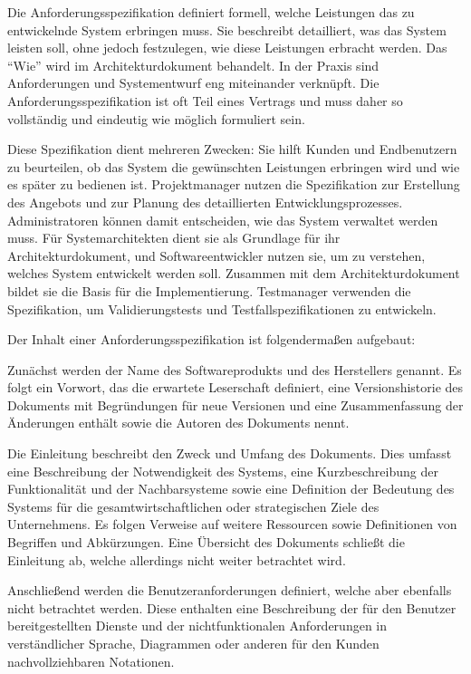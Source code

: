Die Anforderungsspezifikation definiert formell, welche Leistungen das zu entwickelnde System erbringen muss. Sie 
beschreibt detailliert, was das System leisten soll, ohne jedoch festzulegen, wie diese Leistungen erbracht werden. 
Das ``Wie'' wird im Architekturdokument behandelt. In der Praxis sind Anforderungen und Systementwurf eng miteinander 
verknüpft. Die Anforderungsspezifikation ist oft Teil eines Vertrags und muss daher so vollständig und eindeutig wie 
möglich formuliert sein.

Diese Spezifikation dient mehreren Zwecken: Sie hilft Kunden und Endbenutzern zu beurteilen, ob das System die 
gewünschten Leistungen erbringen wird und wie es später zu bedienen ist. Projektmanager nutzen die Spezifikation 
zur Erstellung des Angebots und zur Planung des detaillierten Entwicklungsprozesses. Administratoren können damit 
entscheiden, wie das System verwaltet werden muss. Für Systemarchitekten dient sie als Grundlage für ihr 
Architekturdokument, und Softwareentwickler nutzen sie, um zu verstehen, welches System entwickelt werden soll. 
Zusammen mit dem Architekturdokument bildet sie die Basis für die Implementierung. Testmanager verwenden die 
Spezifikation, um Validierungstests und Testfallspezifikationen zu entwickeln.

Der Inhalt einer Anforderungsspezifikation ist folgendermaßen aufgebaut:

Zunächst werden der Name des Softwareprodukts und des Herstellers genannt. Es folgt ein Vorwort, das die erwartete 
Leserschaft definiert, eine Versionshistorie des Dokuments mit Begründungen für neue Versionen und eine Zusammenfassung 
der Änderungen enthält sowie die Autoren des Dokuments nennt.

Die Einleitung beschreibt den Zweck und Umfang des Dokuments. Dies umfasst eine Beschreibung der Notwendigkeit des 
Systems, eine Kurzbeschreibung der Funktionalität und der Nachbarsysteme sowie eine Definition der Bedeutung des 
Systems für die gesamtwirtschaftlichen oder strategischen Ziele des Unternehmens. Es folgen Verweise auf weitere 
Ressourcen sowie Definitionen von Begriffen und Abkürzungen. Eine Übersicht des Dokuments schließt die Einleitung ab, 
welche allerdings nicht weiter betrachtet wird.

Anschließend werden die Benutzeranforderungen definiert, welche aber ebenfalls nicht betrachtet werden. 
Diese enthalten eine Beschreibung der für den Benutzer bereitgestellten Dienste und der nichtfunktionalen 
Anforderungen in verständlicher Sprache, Diagrammen oder anderen für den Kunden nachvollziehbaren Notationen.

